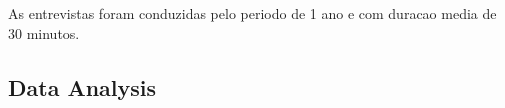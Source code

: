 %


As entrevistas foram conduzidas pelo periodo de 1 ano e com duracao media de
30 minutos.



\subsection{Data Analysis}
